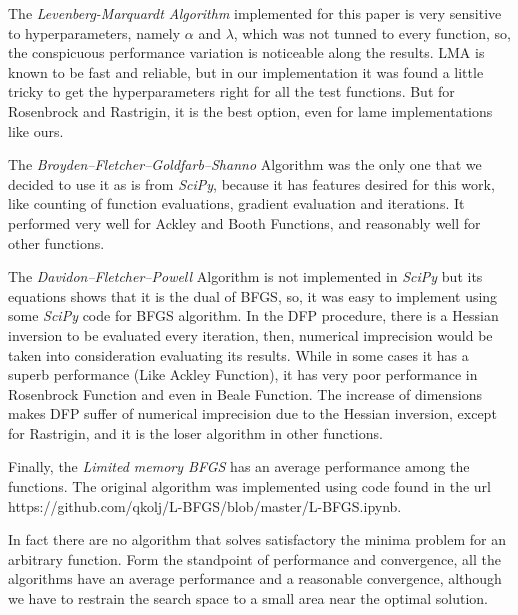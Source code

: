 \documentclass[conference]{IEEEtran}
\begin{document}
The \textit{Levenberg-Marquardt Algorithm} implemented for this paper is very sensitive to hyperparameters, namely $\alpha$ and $\lambda$, which was not tunned to every function, so, the conspicuous performance variation is noticeable along the results. LMA is known to be fast and reliable, but in our implementation it was found a little tricky to get the hyperparameters right for all the test functions. But for Rosenbrock and Rastrigin, it is the best option, even for lame implementations like ours.

The \textit{Broyden–Fletcher–Goldfarb–Shanno} Algorithm was the only one that we decided to use it as is from \textit{SciPy}, because it has features desired for this work, like counting of function evaluations, gradient evaluation and iterations. It performed very well for Ackley and Booth Functions, and reasonably well for other functions.

The \textit{Davidon–Fletcher–Powell} Algorithm is not implemented in \textit{SciPy} but its equations shows that it is the dual of BFGS, so, it was easy to implement using some \textit{SciPy} code for BFGS algorithm. In the DFP procedure, there is a Hessian inversion to be evaluated every iteration, then, numerical imprecision would be taken into consideration evaluating its results. While in some cases it has a superb performance (Like Ackley Function), it has very poor performance in Rosenbrock Function and even in Beale Function. The increase of dimensions makes DFP suffer of numerical imprecision due to the Hessian inversion, except for Rastrigin, and it is the loser algorithm in other functions.

Finally, the \textit{Limited memory BFGS} has an average performance among the functions. The original algorithm was implemented using code found in the url https://github.com/qkolj/L-BFGS/blob/master/L-BFGS.ipynb.

In fact there are no algorithm that solves satisfactory the minima problem for an arbitrary function. Form the standpoint of performance and convergence, all the algorithms have an average performance and a reasonable convergence, although we have to restrain the search space to a small area near the optimal solution.
\end{document}

